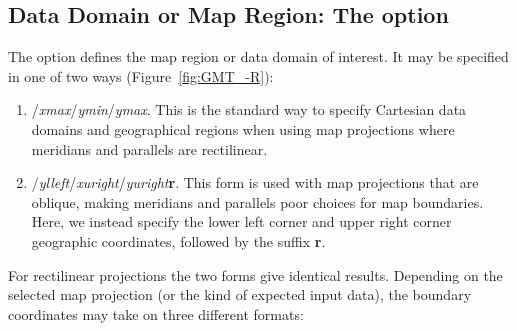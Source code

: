 \subsection{Data Domain or Map Region: The  option}
\label{sec:R}

The  option defines the map region or data domain of interest.  It may be specified
in one of two ways (Figure~\ref{fig:GMT_-R}):
\begin{enumerate}
\item {}/{\it xmax}/{\it ymin}/{\it ymax}.  This is the standard way to specify
Cartesian data domains and geographical regions when using map projections where meridians and
parallels are rectilinear.
\item {}/{\it ylleft}/{\it xuright}/{\it yuright}{\bf r}.
This form is used with map projections that are oblique, making meridians and parallels poor
choices for map boundaries.  Here, we instead specify the lower left corner and upper right
corner geographic coordinates, followed by the suffix {\bf r}.
\end{enumerate}
For rectilinear projections the two forms give identical results.  Depending on the selected map
projection (or the kind of expected input data), the boundary coordinates may take on three different
formats:

